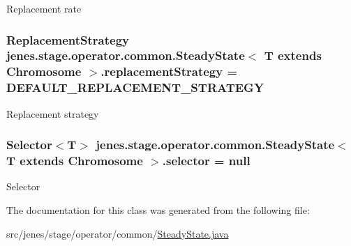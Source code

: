 Replacement rate \hypertarget{classjenes_1_1stage_1_1operator_1_1common_1_1_steady_state_3_01_t_01extends_01_chromosome_01_4_a4d727adbb35eaad5d78fc59abaabea0c}{
\subsubsection[{replacement\-Strategy}]{\setlength{\rightskip}{0pt plus 5cm}Replacement\-Strategy jenes.\-stage.\-operator.\-common.\-Steady\-State$<$ T extends Chromosome $>$.replacement\-Strategy = {\bf D\-E\-F\-A\-U\-L\-T\-\_\-\-R\-E\-P\-L\-A\-C\-E\-M\-E\-N\-T\-\_\-\-S\-T\-R\-A\-T\-E\-G\-Y}\hspace{0.3cm}{\ttfamily [protected]}}}\label{classjenes_1_1stage_1_1operator_1_1common_1_1_steady_state_3_01_t_01extends_01_chromosome_01_4_a4d727adbb35eaad5d78fc59abaabea0c}
Replacement strategy \hypertarget{classjenes_1_1stage_1_1operator_1_1common_1_1_steady_state_3_01_t_01extends_01_chromosome_01_4_a83a734a69acdc4ee13d42982a43e8ba1}{
\subsubsection[{selector}]{\setlength{\rightskip}{0pt plus 5cm}Selector$<$T$>$ jenes.\-stage.\-operator.\-common.\-Steady\-State$<$ T extends Chromosome $>$.selector = null\hspace{0.3cm}{\ttfamily [protected]}}}\label{classjenes_1_1stage_1_1operator_1_1common_1_1_steady_state_3_01_t_01extends_01_chromosome_01_4_a83a734a69acdc4ee13d42982a43e8ba1}
Selector 

The documentation for this class was generated from the following file\-:\begin{DoxyCompactItemize}
\item 
src/jenes/stage/operator/common/\hyperlink{_steady_state_8java}{Steady\-State.\-java}\end{DoxyCompactItemize}
